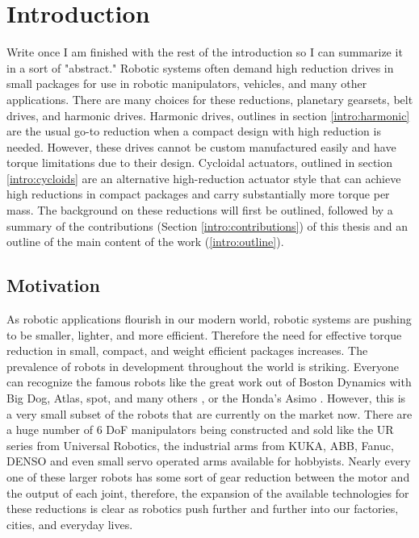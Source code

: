 
\chapter{Introduction}\label{ch:intro}
Write once I am finished with the rest of the introduction so I can summarize it in a sort of "abstract." 
Robotic systems often demand high reduction drives in small packages for use in robotic manipulators, vehicles, and many other applications. There are many choices for these reductions, planetary gearsets, belt drives, and harmonic drives. Harmonic drives, outlines in section \ref{intro:harmonic} are the usual go-to reduction when a compact design with high reduction is needed. However, these drives cannot be custom manufactured easily and have torque limitations due to their design. Cycloidal actuators, outlined in section \ref{intro:cycloids} are an alternative high-reduction actuator style that can achieve high reductions in compact packages and carry substantially more torque per mass. The background on these reductions will first be outlined, followed by a summary of the contributions (Section \ref{intro:contributions}) of this thesis and an outline of the main content of the work (\ref{intro:outline}). 

\section{Motivation} \label{intro:motivation}

As robotic applications flourish in our modern world, robotic systems are pushing to be smaller, lighter, and more efficient. 
Therefore the need for effective torque reduction in small, compact, and weight efficient packages increases. 
The prevalence of robots in development throughout the world is striking. 
Everyone can recognize the famous robots like the great work out of Boston Dynamics with Big Dog, Atlas, spot, and many others \cite{ref:boston_dynamics}, or the Honda's Asimo \cite{ref:asimo}.   
However, this is a very small subset of the robots that are currently on the market now. 
There are a huge number of 6 DoF manipulators being constructed and sold like the UR series from Universal Robotics, the industrial arms from KUKA, ABB, Fanuc, DENSO and even small servo operated arms available for hobbyists. 
Nearly every one of these larger robots has some sort of gear reduction between the motor and the output of each joint, therefore, the expansion of the available technologies for these reductions is clear as robotics push further and further into our factories, cities, and everyday lives. 

